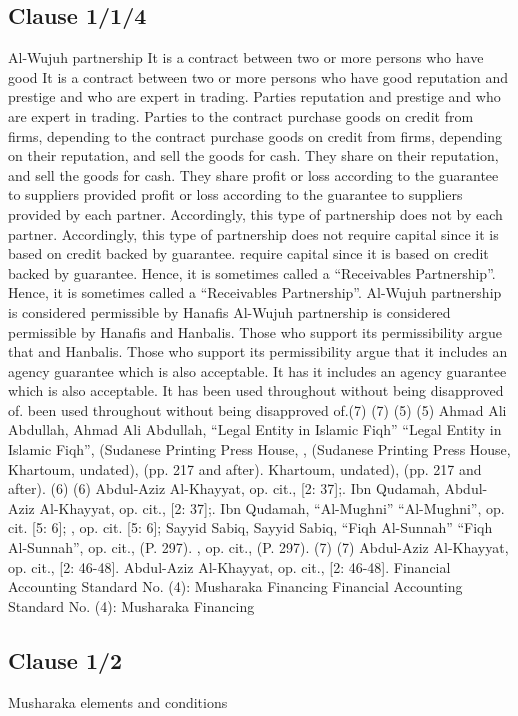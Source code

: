 \documentclass{article}%
\begin{document}
\subsection{Clause 1/1/4}%
\label{subsec:Clause1/1/4}%
Al-Wujuh partnership   It is a contract between two or more persons who have good    It is a contract between two or more persons who have good  reputation and prestige and who are expert in trading. Parties  reputation and prestige and who are expert in trading. Parties  to the contract purchase goods on credit from firms, depending  to the contract purchase goods on credit from firms, depending  on their reputation, and sell the goods for cash. They share  on their reputation, and sell the goods for cash. They share  profit or loss according to the guarantee to suppliers provided  profit or loss according to the guarantee to suppliers provided  by each partner. Accordingly, this type of partnership does not  by each partner. Accordingly, this type of partnership does not  require capital since it is based on credit backed by guarantee.  require capital since it is based on credit backed by guarantee.  Hence, it is sometimes called a “Receivables Partnership”. Hence, it is sometimes called a “Receivables Partnership”.   Al-Wujuh partnership is considered permissible by Hanafis    Al-Wujuh partnership is considered permissible by Hanafis  and Hanbalis. Those who support its permissibility argue that  and Hanbalis. Those who support its permissibility argue that  it includes an agency guarantee which is also acceptable. It has  it includes an agency guarantee which is also acceptable. It has  been used throughout without being disapproved of. been used throughout without being disapproved of.(7) (7) (5) (5) Ahmad Ali Abdullah,   Ahmad Ali Abdullah, “Legal Entity in Islamic Fiqh” “Legal Entity in Islamic Fiqh”, (Sudanese Printing Press House,  , (Sudanese Printing Press House,  Khartoum, undated), (pp. 217 and after). Khartoum, undated), (pp. 217 and after). (6) (6) Abdul-Aziz Al-Khayyat, op. cit., [2: 37];. Ibn Qudamah,   Abdul-Aziz Al-Khayyat, op. cit., [2: 37];. Ibn Qudamah, “Al-Mughni” “Al-Mughni”, op. cit. [5: 6];  , op. cit. [5: 6];  Sayyid Sabiq,  Sayyid Sabiq, “Fiqh Al-Sunnah” “Fiqh Al-Sunnah”, op. cit., (P. 297). , op. cit., (P. 297). (7) (7) Abdul-Aziz Al-Khayyat, op. cit., [2: 46-48].  Abdul-Aziz Al-Khayyat, op. cit., [2: 46-48]. Financial Accounting Standard No. (4): Musharaka Financing Financial Accounting Standard No. (4): Musharaka Financing

%
\subsection{Clause 1/2}%
\label{subsec:Clause1/2}%
Musharaka elements and conditions
\end{document}
